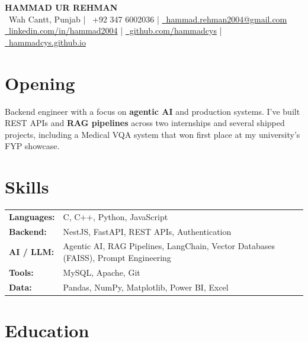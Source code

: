\documentclass[11pt,a4paper]{article}
\begin{document}
\begin{center}
{\LARGE\bfseries HAMMAD UR REHMAN}\\[5pt]
\faMapMarker*\ Wah Cantt, Punjab \quad|\quad
\faPhone\ +92 347 6002036 \quad|\quad
\href{mailto:hammad.rehman2004@gmail.com}{\faEnvelope\ hammad.rehman2004@gmail.com} \\[3pt]
\href{https://linkedin.com/in/hammad2004}{\faLinkedin\ linkedin.com/in/hammad2004} \quad|\quad
\href{https://github.com/hammadcys}{\faGithub\ github.com/hammadcys} \quad|\quad
\href{https://hammadcys.github.io}{\faGlobe\ hammadcys.github.io}
\end{center}

\vspace{0.1cm}


\section*{Opening}

Backend engineer with a focus on \textbf{agentic AI} and production systems. I've built REST APIs and \textbf{RAG pipelines} across two internships and several shipped projects, including a Medical VQA system that won first place at my university's FYP showcase.


\section*{Skills}

\begin{tabular}{>{\bfseries}p{2.8cm}p{11cm}}
Languages:   & C, C++, Python, JavaScript \\
Backend:     & NestJS, FastAPI, REST APIs, Authentication \\
AI / LLM:    & Agentic AI, RAG Pipelines, LangChain, Vector Databases (FAISS), Prompt Engineering \\
Tools:       & MySQL, Apache, Git \\
Data:        & Pandas, NumPy, Matplotlib, Power BI, Excel \\
\end{tabular}


\section*{Education}
\end{document}
